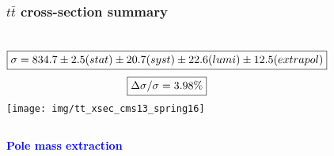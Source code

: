 \documentclass{beamer}
\begin{document}
\begin{frame}
\frametitle{$t\bar{t}$ cross-section summary}
\begin{columns}
\tiny
\begin{align}
\Aboxed{\sigma = 834.7 \pm 2.5 (stat) 
\pm 20.7 (syst) 
\pm 22.6 (lumi) 
\pm 12.5 (extrapol)} \nonumber
\end{align}
\vspace{-0.7cm}
\tiny
\begin{align}
\Aboxed{\Delta \sigma /\sigma  = 3.98 \% }\nonumber
\end{align}
\vspace{-0.17cm}
 \texttt{[image: img/tt\_xsec\_cms13\_spring16]}

\end{columns}
\end{frame}
\begin{frame}
\Huge{\textbf {\textcolor {blue}{Pole mass extraction}}}
\end{frame}
\end{document}
